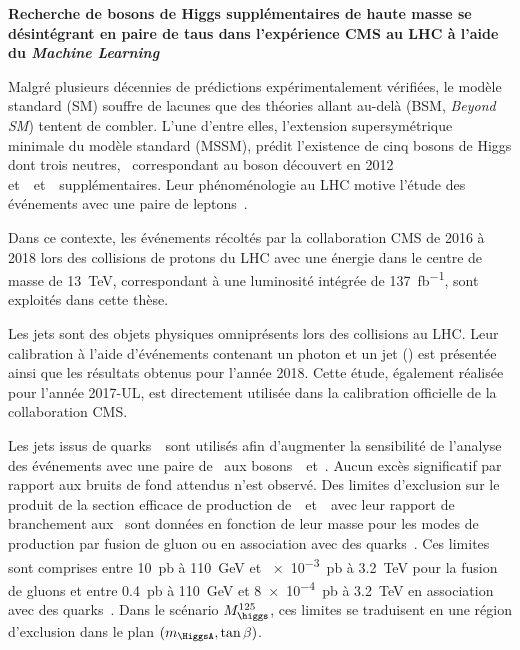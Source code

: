 \begin{center}
\LARGE
\bf
\sffamily
Recherche de bosons de Higgs supplémentaires de haute masse se désintégrant en paire de taus dans l'expérience CMS au LHC à l'aide du \emph{Machine Learning}
\end{center}

\vspace{2\baselineskip}

Malgré plusieurs décennies de prédictions expérimentalement vérifiées,
le modèle standard (SM) souffre de lacunes
que des théories allant au-delà (BSM, \emph{Beyond SM})
tentent de combler.
L'une d'entre elles,
l'extension supersymétrique minimale du modèle standard (MSSM),
prédit l'existence de cinq bosons de Higgs dont trois neutres,
\higgs\ correspondant au boson découvert en 2012
et~\Higgs\ et~\HiggsA\ supplémentaires.
Leur phénoménologie au LHC
motive l'étude des événements avec une paire de leptons~\tau.
\par
Dans ce contexte,
les événements récoltés par la collaboration CMS
de 2016 à 2018
lors des collisions de protons du LHC
avec une énergie dans le centre de masse de \SI{13}{\TeV},
correspondant à une luminosité intégrée de \SI{137}{\femto\barn^{-1}},
sont exploités dans cette thèse.
\par
Les jets sont des objets physiques omniprésents lors des collisions au LHC.
Leur calibration à l'aide d'événements contenant un photon et un jet (\Gjet) est présentée ainsi que les résultats obtenus pour l'année 2018.
Cette étude,
également réalisée pour l'année 2017-UL,
est directement utilisée dans la calibration officielle de la collaboration CMS.
\par
Les jets issus de quarks~\quarkb\ sont utilisés afin d'augmenter la sensibilité de l'analyse
des événements avec une paire de \tau\ aux bosons~\Higgs\ et~\HiggsA.
Aucun excès significatif par rapport aux bruits de fond attendus n'est observé.
Des limites d'exclusion sur le produit de la section efficace de production de~\Higgs\ et~\HiggsA\ avec leur rapport de branchement aux \tau\ sont données
en fonction de leur masse
pour les modes de production par fusion de gluon ou en association avec des quarks~\quarkb.
Ces limites sont comprises entre
\SI{10}{\pico\barn} à \SI{110}{\GeV}
et
\SI{e-3}{\pico\barn} à \SI{3.2}{\TeV}
pour la fusion de gluons
et entre
\SI{0.4}{\pico\barn} à \SI{110}{\GeV}
et
\SI{8e-4}{\pico\barn} à \SI{3.2}{\TeV}
en association avec des quarks~\quarkb.
Dans le scénario $M_{\higgs}^{125}$,
ces limites se traduisent en une région d'exclusion dans le plan $(m_{\HiggsA},\tan\beta)$.

